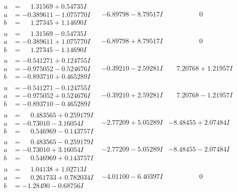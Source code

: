 \documentclass[1p]{elsarticle_modified}
\theoremstyle{definition}
\begin{document}
$$\begin{array}{c|c|c}
\begin{aligned}
u &= \phantom{-}1.31569 + 0.54735 I \\
a &= -0.389611 - 1.075770 I \\
b &= \phantom{-}1.27345 + 1.14690 I\end{aligned}
 & -6.89798 - 8.79517 I & \phantom{-0.000000 } 0 \\ \hline\begin{aligned}
u &= \phantom{-}1.31569 - 0.54735 I \\
a &= -0.389611 + 1.075770 I \\
b &= \phantom{-}1.27345 - 1.14690 I\end{aligned}
 & -6.89798 + 8.79517 I & \phantom{-0.000000 } 0 \\ \hline\begin{aligned}
u &= -0.541271 + 0.124755 I \\
a &= -0.975052 - 0.524676 I \\
b &= -0.893710 + 0.465289 I\end{aligned}
 & -0.39210 - 2.59281 I & \phantom{-}7.20768 + 1.21957 I \\ \hline\begin{aligned}
u &= -0.541271 - 0.124755 I \\
a &= -0.975052 + 0.524676 I \\
b &= -0.893710 - 0.465289 I\end{aligned}
 & -0.39210 + 2.59281 I & \phantom{-}7.20768 - 1.21957 I \\ \hline\begin{aligned}
u &= \phantom{-}0.483565 + 0.259179 I \\
a &= -0.73010 - 3.16054 I \\
b &= \phantom{-}0.546969 - 0.143757 I\end{aligned}
 & -2.77209 + 5.05289 I & -8.48455 + 2.07484 I \\ \hline\begin{aligned}
u &= \phantom{-}0.483565 - 0.259179 I \\
a &= -0.73010 + 3.16054 I \\
b &= \phantom{-}0.546969 + 0.143757 I\end{aligned}
 & -2.77209 - 5.05289 I & -8.48455 - 2.07484 I \\ \hline\begin{aligned}
u &= \phantom{-}1.04138 + 1.02713 I \\
a &= \phantom{-}0.261733 + 0.782034 I \\
b &= -1.28490 - 0.68756 I\end{aligned}
 & -4.01100 - 6.40397 I & \phantom{-0.000000 } 0 \\ \hline\begin{aligned}

\end{aligned}
\end{array}$$
\end{document}
